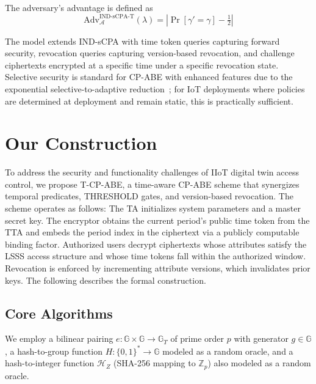 ﻿\documentclass[lettersize,journal]{IEEEtran}
\begin{document}
The adversary's advantage is defined as
\begin{equation}
    \text{Adv}_{\mathcal{A}}^{\text{IND-sCPA-T}}(\lambda)
    = \left|\Pr[\gamma' = \gamma] - \tfrac{1}{2}\right|
    \label{eq:adv_indscpat}
\end{equation}

The model extends IND-sCPA with time token queries
capturing forward security, revocation queries capturing version-based
revocation, and challenge ciphertexts encrypted at a specific time under a
specific revocation state. Selective security is standard for CP-ABE with
enhanced features due to the exponential selective-to-adaptive
reduction~\cite{Li2022_CPABE_Survey}; for IoT deployments where policies are
determined at deployment and remain static, this is practically sufficient.

\section{Our Construction}
\label{sec:construction}

To address the security and functionality challenges of IIoT digital twin
access control, we propose T-CP-ABE, a time-aware CP-ABE scheme that
synergizes temporal predicates, THRESHOLD gates, and version-based
revocation. The scheme operates as follows: The TA initializes system
parameters and a master secret key. The encryptor obtains the current
period's public time token from the TTA and embeds the period index in the
ciphertext via a publicly computable binding factor. Authorized users
decrypt ciphertexts whose attributes satisfy the LSSS access structure and
whose time tokens fall within the authorized window. Revocation is enforced
by incrementing attribute versions, which invalidates prior keys. The
following describes the formal construction.

\subsection{Core Algorithms}
\label{subsec:algorithms}

We employ a bilinear pairing $e: \mathbb{G} \times \mathbb{G}
\rightarrow \mathbb{G}_T$ of prime order $p$ with generator
$g \in \mathbb{G}$, a
hash-to-group function $H: \{0,1\}^* \rightarrow \mathbb{G}$ modeled as
a random oracle, and a hash-to-integer function $\mathcal{H}_Z$ (SHA-256
mapping to $\mathbb{Z}_p$) also modeled as a random oracle.
\end{document}
